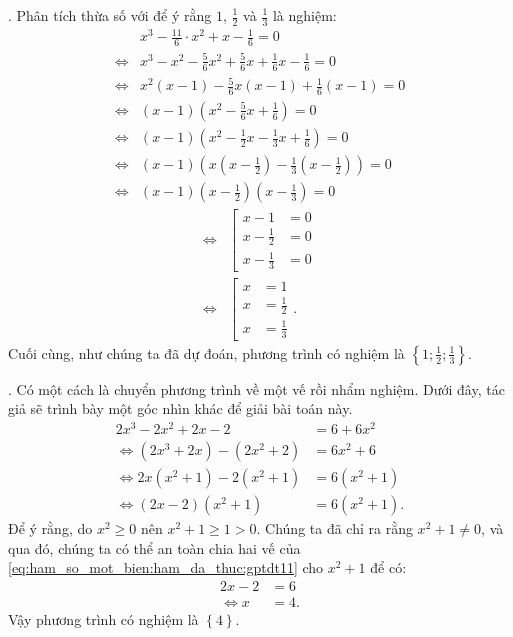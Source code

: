. Phân tích thừa số với để ý rằng $1$, $\frac{1}{2}$ và $\frac{1}{3}$ là nghiệm:
\begin{align*}
   &x^3 - \frac{11}{6}\cdot x^2 + x - \frac{1}{6} = 0 \\
   \iff &x^3 - x^2 - \frac{5}{6}x^2 + \frac{5}{6}x + \frac{1}{6}x - \frac{1}{6} = 0 \\
   \iff &x^2\left(x - 1\right) - \frac{5}{6}x\left(x - 1\right) + \frac{1}{6}\left(x - 1\right) = 0 \\
   \iff &\left(x - 1\right)\left(x^2 - \frac{5}{6}x + \frac{1}{6}\right) = 0 \\
   \iff &\left(x - 1\right)\left(x^2 - \frac{1}{2}x - \frac{1}{3}x + \frac{1}{6}\right) = 0 \\
   \iff &\left(x - 1\right)\left(x\left(x - \frac{1}{2}\right) - \frac{1}{3}\left(x - \frac{1}{2}\right)\right) = 0 \\
   \iff &\left(x - 1\right)\left(x - \frac{1}{2}\right)\left(x - \frac{1}{3}\right) = 0
\end{align*}
\begin{align*}
   \iff &\left[
      \begin{aligned}
         x - 1 &= 0 \\
         x - \frac{1}{2} &= 0 \\
         x - \frac{1}{3} &= 0
      \end{aligned}
   \right. \\
   \iff &\left[
      \begin{aligned}
         x &= 1 \\
         x &= \frac{1}{2} \\
         x &= \frac{1}{3}
      \end{aligned}
   \right..
\end{align*}
Cuối cùng, như chúng ta đã dự đoán, phương trình có nghiệm là $\displaystyle\left\{1; \frac{1}{2}; \frac{1}{3}\right\}$.

. Có một cách là chuyển phương trình về một vế rồi nhẩm nghiệm. Dưới đây, tác giả sẽ trình bày một góc nhìn khác để giải bài toán này.
\begin{align}
   2x^3 - 2x^2 + 2x - 2 &= 6 + 6x^2 \nonumber\\
   \iff \left(2x^3 + 2x\right) - \left(2x^2 + 2\right) &= 6x^2 + 6 \nonumber\\
   \iff 2x\left(x^2 + 1\right) - 2\left(x^2 + 1\right) &= 6\left(x^2 + 1\right) \nonumber\\
   \iff \left(2x - 2\right)\left(x^2 + 1\right) &= 6\left(x^2 + 1\right). \label{eq:ham_so_mot_bien:ham_da_thuc:gptdt11}
\end{align}
Để ý rằng, do $x^2 \geq 0$ nên $x^2 + 1 \geq 1 > 0$. Chúng ta đã chỉ ra rằng $x^2 + 1 \neq 0$, và qua đó, chúng ta có thể an toàn chia hai vế của \ref{eq:ham_so_mot_bien:ham_da_thuc:gptdt11} cho $x^2 + 1$ để có:
\begin{align*}
   2x - 2 &= 6 \\
   \iff x &= 4.
\end{align*}
Vậy phương trình có nghiệm là $\displaystyle\left\{4\right\}$.


